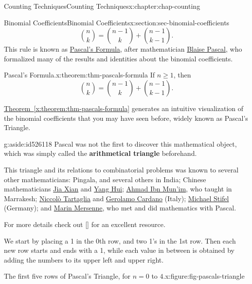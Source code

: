 \documentclass[oneside,10pt,]{book}
\newcommand{\xreffont}{\relax}
\newcommand{\terminology}[1]{\textbf{#1}}
\numberwithin{equation}{section}
\begin{document}
\begin{chapterptx}{Counting Techniques}{}{Counting Techniques}{}{}{x:chapter:chap-counting}
\begin{sectionptx}{Binomial Coefficients}{}{Binomial Coefficients}{}{}{x:section:sec-binomial-coefficients}
\begin{equation*}
\binom{n}{k} = \binom{n-1}{k} + \binom{n-1}{k-1}\text{.}
\end{equation*}
This rule is known as \href{https://en.wikipedia.org/wiki/Pascal\%27s_rule}{Pascal's Formula}, after mathematician \href{https://en.wikipedia.org/wiki/Blaise_Pascal}{Blaise Pascal}, who formalized many of the results and identities about the binomial coefficients.%
\begin{theorem}{Pascal's Formula.}{}{x:theorem:thm-pascals-formula}%
If \(n \geq 1\), then%
\begin{equation*}
\binom{n}{k} = \binom{n-1}{k} + \binom{n-1}{k-1}\text{.}
\end{equation*}
%
\end{theorem}
\hyperref[x:theorem:thm-pascals-formula]{Theorem~{\xreffont\ref{x:theorem:thm-pascals-formula}}} generates an intuitive visualization of the binomial coefficients that you may have seen before, widely known as Pascal's Triangle.%
\begin{aside}{}{g:aside:id526118}%
Pascal was not the first to discover this mathematical object, which was simply called the \terminology{arithmetical triangle} beforehand.%
\par
This triangle and its relations to combinatorial problems was known to several other mathematicians: Pingala, and several others in India; Chinese mathematicians \href{https://en.wikipedia.org/wiki/Jia_Xian}{Jia Xian} and \href{https://en.wikipedia.org/wiki/Yang_Hui}{Yang Hui}; \href{https://en.wikipedia.org/wiki/Ahmad_ibn_Munim_al-Abdari}{Ahmad Ibn Mun'im}, who taught in Marrakesh; \href{https://en.wikipedia.org/wiki/Niccol\%C3\%B2_Fontana_Tartaglia}{Niccolò Tartaglia} and \href{https://en.wikipedia.org/wiki/Gerolamo_Cardano}{Gerolamo Cardano} (Italy); \href{https://en.wikipedia.org/wiki/Michael_Stifel}{Michael Stifel} (Germany); and \href{https://en.wikipedia.org/wiki/Marin_Mersenne}{Marin Mersenne}, who met and did mathematics with Pascal.%
\par
For more details check out \hyperlink{x:biblio:bib-wilson-2013}{[{\xreffont 8}]} for an excellent resource.%
\end{aside}
We start by placing a 1 in the 0th row, and two 1's in the 1st row. Then each new row starts and ends with a 1, while each value in between is obtained by adding the numbers to its upper left and upper right.%
\begin{figureptx}{The first five rows of Pascal's Triangle, for \(n = 0\) to \(4\).}{x:figure:fig-pascals-triangle}{}%

\end{figureptx}
\end{sectionptx}
\end{chapterptx}
\end{document}

